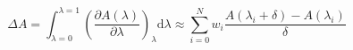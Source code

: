 


\[ \Delta A = \int_{\lambda=0}^{\lambda=1} \left( \frac{\partial
    A(\lambda)}{\partial\lambda} \right)_\lambda \mathrm{d}\lambda
\approx \sum_{i=0}^N w_i \frac{A(\lambda_{i} + \delta) -
  A(\lambda_i)}{\delta} \]


